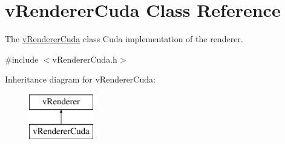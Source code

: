 \hypertarget{classvRendererCuda}{\section{v\-Renderer\-Cuda Class Reference}
\label{classvRendererCuda}
}


The \hyperlink{classvRendererCuda}{v\-Renderer\-Cuda} class Cuda implementation of the renderer.  




{\ttfamily \#include $<$v\-Renderer\-Cuda.\-h$>$}

Inheritance diagram for v\-Renderer\-Cuda\-:\begin{figure}[H]
\begin{center}
\leavevmode
\includegraphics[height=2.000000cm]{classvRendererCuda}
\end{center}
\end{figure}

